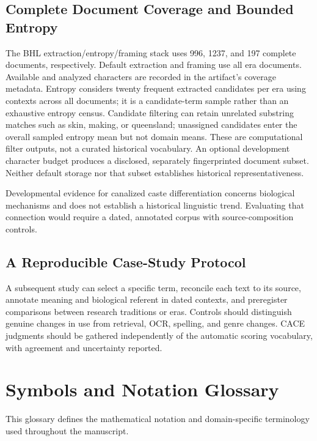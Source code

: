 \documentclass[
]{article}
\numberwithin{equation}{section}
\begin{document}
\subsection{Complete Document Coverage and Bounded
Entropy}\label{complete-document-coverage-and-bounded-entropy}

The BHL extraction/entropy/framing stack uses 996, 1237, and 197
complete documents, respectively. Default extraction and framing use all
era documents. Available and analyzed characters are recorded in the
artifact's coverage metadata. Entropy considers twenty frequent
extracted candidates per era using contexts across all documents; it is
a candidate-term sample rather than an exhaustive entropy census.
Candidate filtering can retain unrelated substring matches such as skin,
making, or queensland; unassigned candidates enter the overall sampled
entropy mean but not domain means. These are computational filter
outputs, not a curated historical vocabulary. An optional development
character budget produces a disclosed, separately fingerprinted document
subset. Neither default storage nor that subset establishes historical
representativeness.

Developmental evidence for canalized caste differentiation
\citep{qiu2022canalized} concerns biological mechanisms and does not
establish a historical linguistic trend. Evaluating that connection
would require a dated, annotated corpus with source-composition
controls.

\subsection{A Reproducible Case-Study
Protocol}\label{a-reproducible-case-study-protocol}

A subsequent study can select a specific term, reconcile each text to
its source, annotate meaning and biological referent in dated contexts,
and preregister comparisons between research traditions or eras.
Controls should distinguish genuine changes in use from retrieval, OCR,
spelling, and genre changes. CACE judgments should be gathered
independently of the automatic scoring vocabulary, with agreement and
uncertainty reported.

\clearpage

\section{Symbols and Notation Glossary}\label{sec:glossary}

This glossary defines the mathematical notation and domain-specific
terminology used throughout the manuscript.
\end{document}
